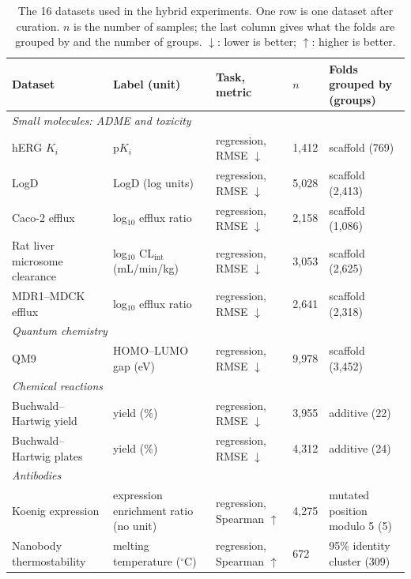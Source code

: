 \begin{table}[htbp]
\centering
\small
\setlength{\tabcolsep}{3pt}
\caption{The 16 datasets used in the hybrid experiments. One row is one dataset after curation. $n$ is the number of samples; the last column gives what the folds are grouped by and the number of groups. $\downarrow$: lower is better; $\uparrow$: higher is better.}
\label{tab:datasets}
\begin{tabular}{p{3.0cm}p{3.3cm}p{2.3cm}p{1.1cm}p{3.5cm}}
\toprule
Dataset & Label (unit) & Task, metric & $n$ & Folds grouped by (groups) \\
\midrule
\multicolumn{5}{l}{\textit{Small molecules: ADME and toxicity}} \\
hERG $K_i$ \citep{Zdrazil2023} & p$K_i$ & regression, RMSE $\downarrow$ & 1,412 & scaffold (769) \\
LogD \citep{openadmet} & LogD (log units) & regression, RMSE $\downarrow$ & 5,028 & scaffold (2,413) \\
Caco-2 efflux \citep{openadmet} & log$_{10}$ efflux ratio & regression, RMSE $\downarrow$ & 2,158 & scaffold (1,086) \\
Rat liver microsome clearance \citep{fang2023, polaris} & log$_{10}$ CL$_\text{int}$ (mL/min/kg) & regression, RMSE $\downarrow$ & 3,053 & scaffold (2,625) \\
MDR1--MDCK efflux \citep{fang2023, polaris} & log$_{10}$ efflux ratio & regression, RMSE $\downarrow$ & 2,641 & scaffold (2,318) \\
\midrule
\multicolumn{5}{l}{\textit{Quantum chemistry}} \\
QM9 \citep{Ramakrishnan2014, qm9_dataset} & HOMO--LUMO gap (eV) & regression, RMSE $\downarrow$ & 9,978 & scaffold (3,452) \\
\midrule
\multicolumn{5}{l}{\textit{Chemical reactions}} \\
Buchwald--Hartwig yield \citep{Ahneman2018} & yield (\%) & regression, RMSE $\downarrow$ & 3,955 & additive (22) \\
Buchwald--Hartwig plates \citep{Ahneman2018} & yield (\%) & regression, RMSE $\downarrow$ & 4,312 & additive (24) \\
\midrule
\multicolumn{5}{l}{\textit{Antibodies}} \\
Koenig expression \citep{Koenig2017, Chungyoun2024} & expression enrichment ratio (no unit) & regression, Spearman $\uparrow$ & 4,275 & mutated position modulo 5 (5) \\
Nanobody thermostability \citep{ValdesTresanco2023, Chungyoun2024} & melting temperature ($^\circ$C) & regression, Spearman $\uparrow$ & 672 & 95\% identity cluster (309) \\

\end{tabular}
\end{table}
